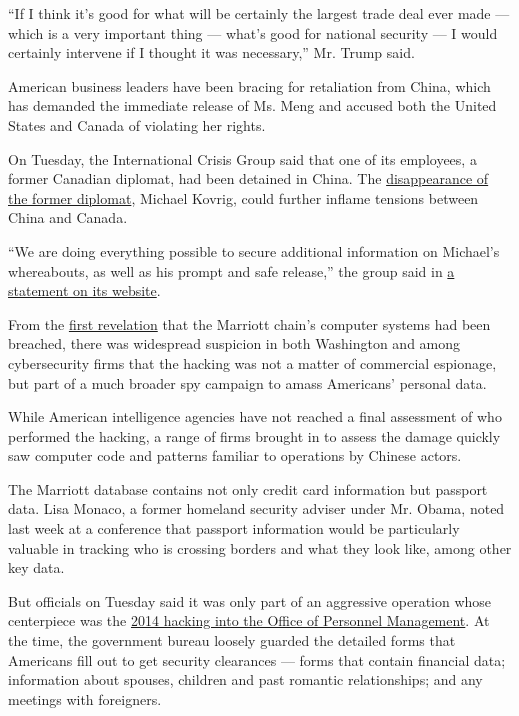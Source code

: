 ``If I think it's good for what will be certainly the largest trade deal
ever made --- which is a very important thing --- what's good for
national security --- I would certainly intervene if I thought it was
necessary,'' Mr. Trump said.

American business leaders have been bracing for retaliation from China,
which has demanded the immediate release of Ms. Meng and accused both
the United States and Canada of violating her rights.

On Tuesday, the International Crisis Group said that one of its
employees, a former Canadian diplomat, had been detained in China. The
\href{https://www.nytimes.com/2018/12/11/world/asia/michael-kovrig-china-canada.html}{disappearance
of the former diplomat}, Michael Kovrig, could further inflame tensions
between China and Canada.

``We are doing everything possible to secure additional information on
Michael's whereabouts, as well as his prompt and safe release,'' the
group said in
\href{https://www.crisisgroup.org/who-we-are/crisis-group-updates/detention-crisis-group-senior-advisor}{a
statement on its website}.

From the
\href{https://www.nytimes.com/2018/11/30/business/marriott-data-breach.html}{first
revelation} that the Marriott chain's computer systems had been
breached, there was widespread suspicion in both Washington and among
cybersecurity firms that the hacking was not a matter of commercial
espionage, but part of a much broader spy campaign to amass Americans'
personal data.

While American intelligence agencies have not reached a final assessment
of who performed the hacking, a range of firms brought in to assess the
damage quickly saw computer code and patterns familiar to operations by
Chinese actors.

The Marriott database contains not only credit card information but
passport data. Lisa Monaco, a former homeland security adviser under Mr.
Obama, noted last week at a conference that passport information would
be particularly valuable in tracking who is crossing borders and what
they look like, among other key data.

But officials on Tuesday said it was only part of an aggressive
operation whose centerpiece was the
\href{https://www.nytimes.com/2015/06/05/us/breach-in-a-federal-computer-system-exposes-personnel-data.html}{2014
hacking into the Office of Personnel Management}. At the time, the
government bureau loosely guarded the detailed forms that Americans fill
out to get security clearances --- forms that contain financial data;
information about spouses, children and past romantic relationships; and
any meetings with foreigners.

